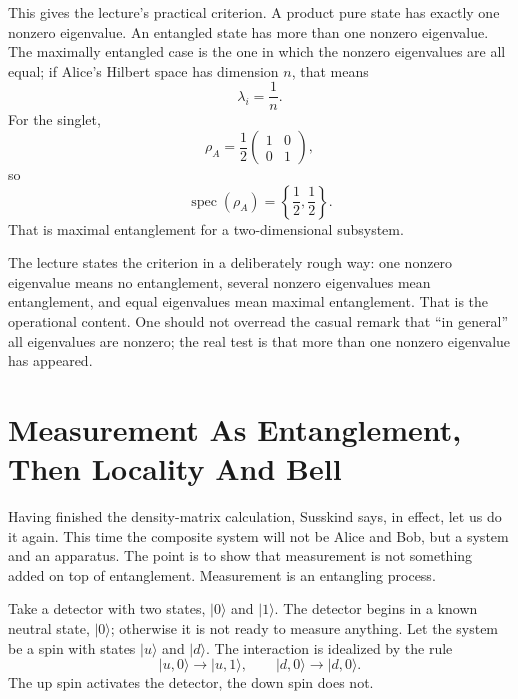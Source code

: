This gives the lecture's practical criterion. A product pure state has exactly one nonzero eigenvalue. An entangled state has more than one nonzero eigenvalue. The maximally entangled case is the one in which the nonzero eigenvalues are all equal; if Alice's Hilbert space has dimension $n$, that means
\begin{equation}
\lambda_i=\frac{1}{n}.
\end{equation}
For the singlet,
\begin{equation}
\rho_A
=
\frac12
\begin{pmatrix}
1 & 0 \\
0 & 1
\end{pmatrix},
\end{equation}
so
\begin{equation}
\operatorname{spec}(\rho_A)=\left\{\frac12,\frac12\right\}.
\end{equation}
That is maximal entanglement for a two-dimensional subsystem.

The lecture states the criterion in a deliberately rough way: one nonzero eigenvalue means no entanglement, several nonzero eigenvalues mean entanglement, and equal eigenvalues mean maximal entanglement. That is the operational content. One should not overread the casual remark that ``in general'' all eigenvalues are nonzero; the real test is that more than one nonzero eigenvalue has appeared.

\section{Measurement As Entanglement, Then Locality And Bell}

Having finished the density-matrix calculation, Susskind says, in effect, let us do it again. This time the composite system will not be Alice and Bob, but a system and an apparatus. The point is to show that measurement is not something added on top of entanglement. Measurement is an entangling process.

Take a detector with two states, $|0\rangle$ and $|1\rangle$. The detector begins in a known neutral state, $|0\rangle$; otherwise it is not ready to measure anything. Let the system be a spin with states $|u\rangle$ and $|d\rangle$. The interaction is idealized by the rule
\begin{equation}
|u,0\rangle\to|u,1\rangle,
\qquad
|d,0\rangle\to|d,0\rangle.
\end{equation}
The up spin activates the detector, the down spin does not.

